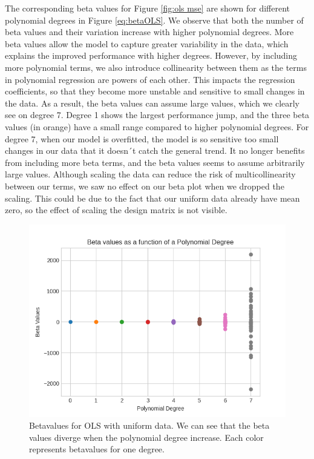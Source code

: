 The corresponding beta values for Figure \ref{fig:ols mse} are shown for different polynomial degrees in Figure \ref{eq:betaOLS}. We observe that both the number of beta values and their variation increase with higher polynomial degrees. More beta values allow the model to capture greater variability in the data, which explains the improved performance with higher degrees. However, by including more polynomial terms, we also introduce collinearity between them as the terms in polynomial regression are powers of each other. This impacts the regression coefficients, so that they become more unstable and sensitive to small changes in the data. \cite{polyreg_budescu} As a result, the beta values can assume large values, which we clearly see on degree 7.  Degree 1 shows the largest performance jump, and the three beta values (in orange) have a small range compared to higher polynomial degrees. For degree 7, when our model is overfitted, the model is so sensitive too small changes in our data that it doesn´t catch the general trend. It no longer benefits from including more beta terms, and the beta values seems to assume arbitrarily large values. 
Although scaling the data can reduce the risk of multicollinearity between our terms\cite{polyreg_budescu}, we saw no effect on our beta plot when we dropped the scaling. This could be due to the fact that our uniform data already have mean zero, so the effect of scaling the design matrix is not visible. 
\begin{figure}[H]
     \includegraphics[width=15cm]{Images/beta_ols.png}
     \caption{Betavalues for OLS with uniform data. We can see that the beta values diverge when the polynomial degree increase. Each color represents betavalues for one degree.}
     \label{fig:betavalues_ols}
\end{figure}

